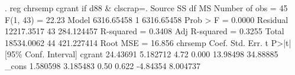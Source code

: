. reg chrsemp cgrant if d88 \& clscrap{\tytilde}=.
{\smallskip}
      Source {\VBAR}       SS           df       MS      Number of obs   =        45
   F(1, 43)        =     22.23
       Model {\VBAR}  6316.65458         1  6316.65458   Prob > F        =    0.0000
    Residual {\VBAR}  12217.3517        43  284.124457   R-squared       =    0.3408
   Adj R-squared   =    0.3255
       Total {\VBAR}  18534.0062        44  421.227414   Root MSE        =    16.856
{\smallskip}
     chrsemp {\VBAR}      Coef.   Std. Err.      t    P>|t|     [95\% Conf. Interval]
      cgrant {\VBAR}   24.43691   5.182712     4.72   0.000     13.98498    34.88885
       _cons {\VBAR}   1.580598   3.185483     0.50   0.622     -4.84354    8.004737
{\smallskip}
